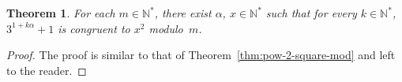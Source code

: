 \documentclass[12pt]{article}
\newcommand{\bN}{\mathbb{N}} %
\newcommand{\bNast}{\bN^*}
\newtheorem{theorem}{Theorem}
\theoremstyle{definition}
\begin{document}
   \begin{theorem}
     For each $m \in \bNast$,
     there exist $\alpha$, $x \in \bNast$ such that for every $k \in \bNast$, 
     $3^{1 + k \alpha} + 1$ is congruent to $x^2$ modulo~$m$.
   \end{theorem}

   \begin{proof}
     The proof is similar to that of Theorem~\ref{thm:pow-2-square-mod} and left to the reader.
    \end{proof} 
\end{document}
